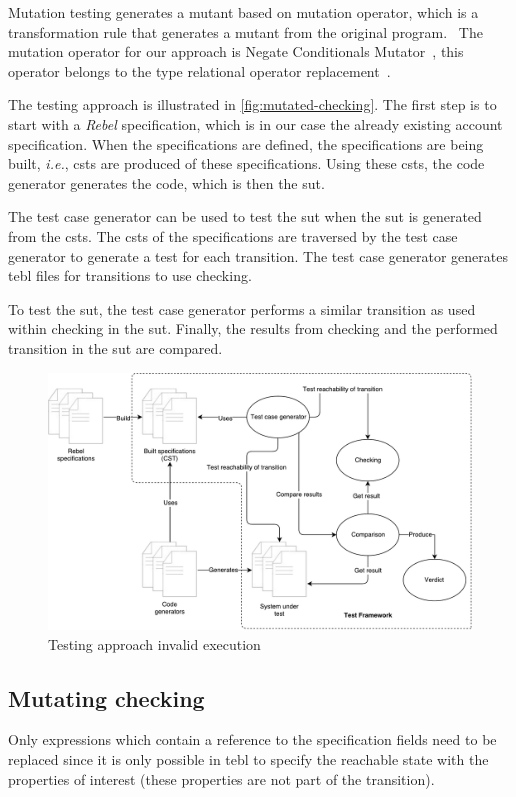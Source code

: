 Mutation testing generates a mutant based on
mutation operator, which is a transformation rule that generates a mutant from
the original program.~\cite[p.~3-4]{jia2011analysis} The mutation operator for
our approach is Negate Conditionals Mutator~\cite{pitmutators}, this operator
belongs to the type relational operator
replacement~\cite[p.~688]{king1991fortran}.

The testing approach is illustrated in \autoref{fig:mutated-checking}. The first
step is to start with a \textit{Rebel} specification, which is in our case the already
existing account specification. When the specifications are defined, the
specifications are being built, \textit{i.e.}, \gls{csts} are
produced of these specifications. Using these \gls{csts}, the code generator generates
the code, which is then the \gls{sut}.

The test case generator can be used to test the \gls{sut} when the \gls{sut} is generated
from the \gls{csts}. The \gls{csts} of the specifications are traversed by the test case
generator to generate a test for each transition. The test case generator
generates tebl files for transitions to use checking.

To test the \gls{sut}, the test case generator performs a similar transition
as used within checking in the \gls{sut}. Finally, the results from checking and the
performed transition in the \gls{sut} are compared.

\begin{figure}[h!]
  \centering
  \includegraphics[width=\linewidth{}]{figures/mutated-checking-diagram.pdf}
  \caption{Testing approach invalid execution}\label{fig:mutated-checking}
\end{figure}
\FloatBarrier

\subsection{Mutating checking}
Only expressions which contain a reference to the specification fields need to
be replaced since it is only possible in tebl to specify the reachable state
with the properties of interest (these properties are not part of the
transition).

